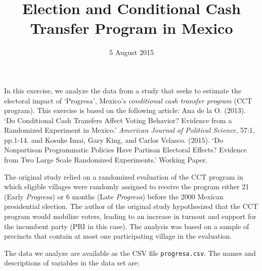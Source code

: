 \documentclass[]{article}
\title{Election and Conditional Cash Transfer Program in Mexico}
\author{}
\date{5 August 2015}
\begin{document}
\maketitle


In this exercise, we analyze the data from a study that seeks to
estimate the electoral impact of `Progresa', Mexico's \emph{conditional
cash transfer program} (CCT program). This exercise is based on the
following article: Ana de la O. (2013). `Do Conditional Cash Transfers
Affect Voting Behavior? Evidence from a Randomized Experiment in
Mexico.' \emph{American Journal of Political Science}, 57:1, pp.1-14.
and Kosuke Imai, Gary King, and Carlos Velasco. (2015). `Do Nonpartisan
Programmatic Policies Have Partisan Electoral Effects? Evidence from Two
Large Scale Randomized Experiments.' Working Paper.

The original study relied on a randomized evaluation of the CCT program
in which eligible villages were randomly assigned to receive the program
either 21 (Early \emph{Progresa}) or 6 months (Late \emph{Progresa})
before the 2000 Mexican presidential election. The author of the
original study hypothesized that the CCT program would mobilize voters,
leading to an increase in turnout and support for the incumbent party
(PRI in this case). The analysis was based on a sample of precincts that
contain at most one participating village in the evaluation.

The data we analyze are available as the CSV file \texttt{progresa.csv}.
The names and descriptions of variables in the data set are:
\end{document}
